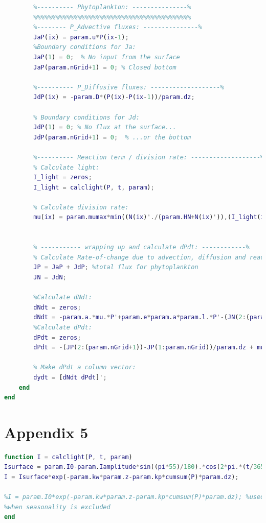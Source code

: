 \begin{lstlisting}[language=Matlab, caption = NPD.m - the body of the model that calculates the derivative of the ODEs]
        %%%%%%%%%%%%%%%%%%%%%%%%%%%%%%%%%%%%%%%%%%%
        %---------- Phytoplankton: ---------------%
        %%%%%%%%%%%%%%%%%%%%%%%%%%%%%%%%%%%%%%%%%%%        
        %-------- P_Advective fluxes: ---------------%
        JaP(ix) = param.u*P(ix-1);
        %Boundary conditions for Ja:
        JaP(1) = 0;  % No input from the surface
        JaP(param.nGrid+1) = 0; % Closed bottom
        
        %---------- P_Diffusive fluxes: -------------------%
        JdP(ix) = -param.D*(P(ix)-P(ix-1))/param.dz;
        
        % Boundary conditions for Jd:
        JdP(1) = 0; % No flux at the surface...
        JdP(param.nGrid+1) = 0;  % ...or the bottom
        
        %---------- Reaction term / division rate: -------------------%
        % Calculate light:
        I_light = zeros;
        I_light = calclight(P, t, param);
        
        % Calculate division rate:
        mu(ix) = param.mumax*min((N(ix)'./(param.HN+N(ix)')),(I_light(ix)./(param.HI+I_light(ix))));
        
        
        % ----------- wrapping up and calculate dPdt: ------------%
        % Calculate Rate-of-change due to advection, diffusion and reaction:
        JP = JaP + JdP; %total flux for phytoplankton
        JN = JdN;
        
        %Calculate dNdt:
        dNdt = zeros;
        dNdt = -param.a.*mu.*P'+param.e*param.a*param.l.*P'-(JN(2:(param.nGrid+1))-JN(1:param.nGrid))/param.dz;
        %Calculate dPdt:
        dPdt = zeros;
        dPdt = -(JP(2:(param.nGrid+1))-JP(1:param.nGrid))/param.dz + mu.*P'- param.l.*P';
        
        % Make dPdt a column vector:
        dydt = [dNdt dPdt]';
    end
end 
\end{lstlisting}

\section{Appendix 5}
\begin{lstlisting}[language=Matlab, caption = calclight.m - used to calculate the seasonality of surface incident light and the light intensity throughout the water column]
% Calculating light:
function I = calclight(P, t, param)
Isurface = param.I0-param.Iamplitude*sin((pi*55)/180).*cos(2*pi.*(t/365));
I = Isurface*exp(-param.kw*param.z-param.kp*cumsum(P)*param.dz);

%I = param.I0*exp(-param.kw*param.z-param.kp*cumsum(P)*param.dz); %used
%when seasonality is excluded
end
\end{lstlisting}

